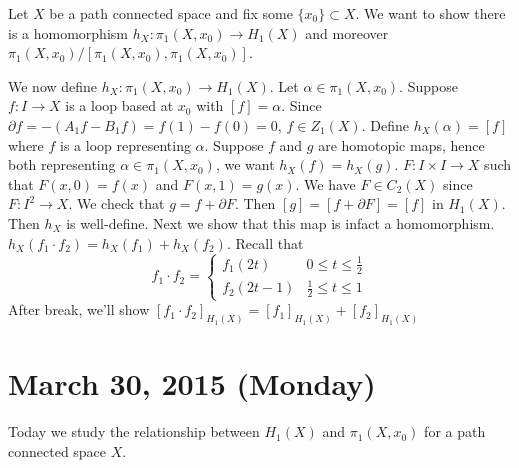 \documentclass{article}
\begin{document}
Let $X$ be a path connected space and fix some $\{ x_0 \} \subset X$. We want to show there is a homomorphism $h_X: \pi_1(X,x_0) \to H_1(X)$ and moreover $\pi_1(X,x_0)/[\pi_1(X,x_0),\pi_1(X,x_0)]$.

We now define $h_X: \pi_1(X, x_0) \to H_1(X)$. Let $\alpha \in \pi_1(X,x_0)$. Suppose $f:I \to X$ is a loop based at $x_0$ with $[f] = \alpha$. Since $\partial f = -(A_1f -B_1f) = f(1) - f(0) = 0$, $f \in Z_1(X)$. Define $h_X(\alpha) = [f]$ where $f$ is a loop representing $\alpha$. Suppose $f$ and $g$ are homotopic maps, hence both representing $\alpha \in \pi_1(X,x_0)$, we want $h_X(f) = h_X(g)$. $F:I \times I \to X$ such that $F(x,0) = f(x)$ and $F(x,1) = g(x)$. We have $F \in C_2(X)$ since $F: I^2 \to X$. We check that $g = f + \partial F$. Then $[g] = [f + \partial F] = [f]$ in $H_1(X)$. Then $h_X$ is well-define. Next we show that this map is infact a homomorphism. $h_X(f_1\cdot f_2) = h_X(f_1) + h_X(f_2)$. Recall that
\[
f_1 \cdot f_2 = \begin{cases}
f_1(2t) & 0 \leq t \leq \frac{1}{2} \\
f_2(2t - 1) & \frac{1}{2} \leq t \leq 1
\end{cases}
\]
After break, we'll show $[f_1 \cdot f_2]_{H_1(X)} = [f_1]_{H_1(X)} + [f_2]_{H_1(X)}$

\section{March 30, 2015 (Monday)}
Today we study the relationship between $H_1(X)$ and $\pi_1(X,x_0)$ for a path connected space $X$.
\end{document}
